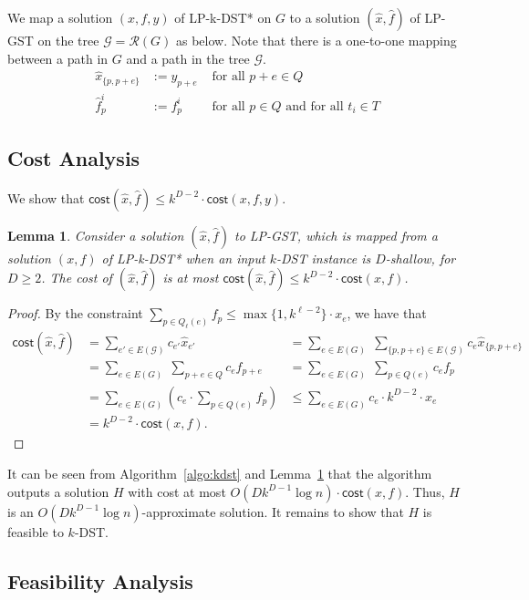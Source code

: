 \documentclass[11pt]{article}
\newtheorem{lemma}[theorem]{Lemma}
\theoremstyle{definition}
\theoremstyle{remark}
\newcommand{\calG}{\mathcal{G}}
\newcommand{\calR}{\mathcal{R}}
\newcommand{\cost}{\mathsf{cost}}
\begin{document}
We map a solution $(x,f,y)$ of LP-k-DST* on $G$ to 
a solution $(\hat{x},\hat{f})$ of LP-GST on the tree $\calG=\calR(G)$
as below.
Note that there is a one-to-one mapping between a path in $G$ and 
a path in the tree $\calG$.
\[
\begin{array}{rll}
\hat{x}_{\{p,p+e\}}  &:= y_{p+e} & \mbox{ for all $p+e \in Q$}\\
\hat{f}^i_{p}      &:= f^i_p & 
   \mbox{ for all $p \in Q$ and for all $t_i\in T$}
\end{array}
\]

\subsection{Cost Analysis}
\label{sec:cost-analysis}

We show that $\cost(\hat{x},\hat{f}) \leq k^{D-2}\cdot \cost(x,f,y)$.

\begin{lemma}
\label{lem:cost-kdst-mapping}
Consider a solution $(\hat{x},\hat{f})$ to LP-GST, which is mapped from 
a solution $(x,f)$ of LP-k-DST* when 
an input $k$-DST instance is $D$-shallow,
for $D\geq 2$.
The cost of $(\hat{x},\hat{f})$ is at most
$\cost(\hat{x},\hat{f}) \leq k^{D-2}\cdot \cost(x,f)$.
\end{lemma}
\begin{proof}
By the constraint 
$\sum_{p\in Q_{\ell}(e)}f_p \leq \max\{1,k^{\ell-2}\}\cdot x_e$,
we have that
\[
\begin{array}{rlll}
\cost(\hat{x},\hat{f}) 
  &= \sum_{e'\in E(\calG)}c_{e'}\hat{x}_{e'}
  &= \sum_{e\in E(G)}\;\sum_{\{p,p+e\}\in E(\calG)}c_e\hat{x}_{\{p,p+e\}}\\
  &= \sum_{e\in E(G)}\;\sum_{p+e\in Q}c_e f_{p+e}
  &= \sum_{e\in E(G)}\;\sum_{p\in Q(e)}c_e f_p\\
  &= \sum_{e\in E(G)}\left(c_e\cdot\sum_{p\in Q(e)}f_p\right)
  &\leq \sum_{e\in E(G)}c_e\cdot k^{D-2}\cdot x_e\\
  &= k^{D-2}\cdot\cost(x,f).
\end{array}
\]
\end{proof}

It can be seen from Algorithm~\ref{algo:kdst} and 
Lemma~\ref{lem:cost-kdst-mapping} that 
the algorithm outputs a solution $H$ with cost 
at most $O(D k^{D-1}\log n)\cdot\cost(x,f)$.
Thus, $H$ is an $O(D k^{D-1}\log n)$-approximate solution.
It remains to show that $H$ is feasible to $k$-DST.

\subsection{Feasibility Analysis}
\label{sec:feasibility-analysis}
\end{document}
